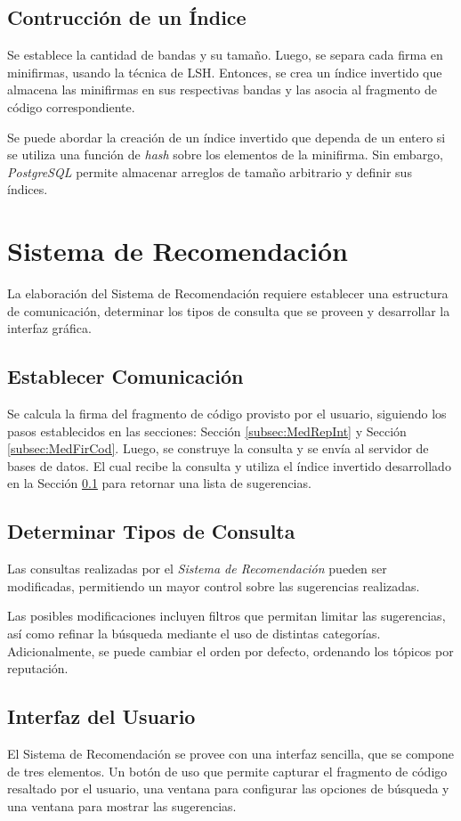 \subsection{Contrucción de un Índice}
\label{subsec:MedConInd}

Se establece la cantidad de bandas y su tamaño.
Luego, se separa cada firma en minifirmas,
usando la técnica de \ac{LSH}.
Entonces, se crea un índice invertido que almacena
las minifirmas en sus respectivas bandas
y las asocia al fragmento de código correspondiente.

Se puede abordar la creación de un índice invertido que
dependa de un entero si se utiliza una función de \textit{hash}
sobre los elementos de la minifirma.
Sin embargo, \textit{PostgreSQL} permite almacenar arreglos
de tamaño arbitrario y definir sus índices.

\section{Sistema de Recomendación}
\label{sec:MedConSisRec}

La elaboración del Sistema de Recomendación requiere establecer una estructura
de comunicación, determinar los tipos de consulta que se proveen y desarrollar
la interfaz gráfica.

\subsection{Establecer Comunicación}

Se calcula la firma del fragmento de código provisto por el usuario, 
siguiendo los pasos establecidos en las secciones:
Sección \ref{subsec:MedRepInt} y Sección \ref{subsec:MedFirCod}.
Luego, se construye la consulta y se envía al servidor de
bases de datos. El cual recibe la consulta y utiliza el
índice invertido desarrollado en la Sección \ref{subsec:MedConInd}
para retornar una lista de sugerencias.

\subsection{Determinar Tipos de Consulta}

Las consultas realizadas por el \textit{Sistema de Recomendación} pueden
ser modificadas, permitiendo un mayor control sobre las 
sugerencias realizadas.

Las posibles modificaciones incluyen filtros que permitan
limitar las sugerencias, así como refinar la búsqueda
mediante el uso de distintas categorías.
Adicionalmente, se puede cambiar el orden por defecto,
ordenando los tópicos por reputación.

\subsection{Interfaz del Usuario}

El Sistema de Recomendación se provee con una interfaz
sencilla, que se compone de tres elementos.
Un botón de uso que permite capturar el fragmento de código
resaltado por el usuario, una ventana para
configurar las opciones de búsqueda y una 
ventana para mostrar las sugerencias.